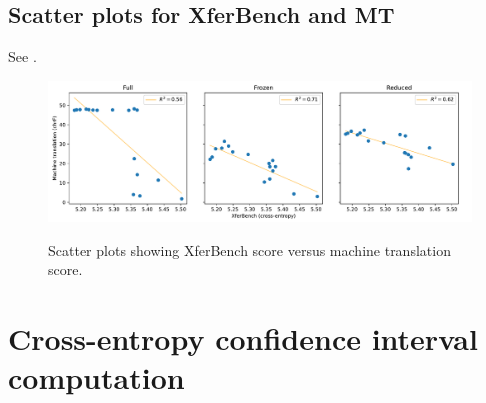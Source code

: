 \subsection{Scatter plots for XferBench and MT}
\unskip\label{sec:scatter}
See .
\begin{figure}
  \centering
  \includegraphics[width=\textwidth]{chapters/xferbench/src/figures/correlation}
  \caption{Scatter plots showing XferBench score versus machine translation score.}
  \unskip\label{fig:scatter}
\end{figure}

\section{Cross-entropy confidence interval computation}
\unskip\label{sec:bootstrapping}

